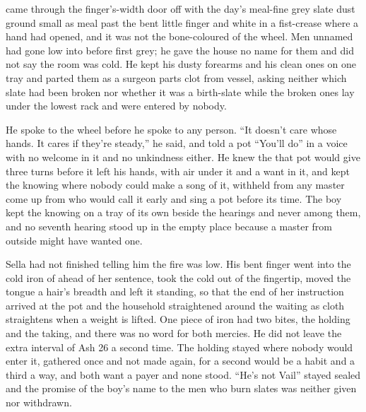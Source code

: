  came through the finger's-width door off  with the day's meal-fine grey slate dust ground small as meal past the bent little finger and white in a fist-crease where a hand had opened, and it was not the bone-coloured  of the wheel. Men unnamed had gone low into  before first grey; he gave the house no name for them and did not say the room was cold. He kept his dusty forearms and his clean ones on one tray and parted them as a surgeon parts clot from vessel, asking neither which slate had been broken nor whether it was a birth-slate while the broken ones lay under the lowest rack and were entered by nobody.

He spoke to the wheel before he spoke to any person. “It doesn't care whose hands. It cares if they're steady,” he said, and told a pot “You'll do” in a voice with no welcome in it and no unkindness either. He knew the  that pot would give three turns before it left his hands, with air under it and a want in it, and kept the knowing where nobody could make a song of it, withheld from any master come up from  who would call it early and sing a pot before its time. The boy kept the knowing on a tray of its own beside the hearings and never among them, and no seventh hearing stood up in the empty place because a master from outside might have wanted one.

Sella had not finished telling him the fire was low. His bent finger went into the cold iron of  ahead of her sentence, took the cold out of the fingertip, moved the tongue a hair's breadth and left it standing, so that the end of her instruction arrived at the pot and the household straightened around the waiting as cloth straightens when a weight is lifted. One piece of iron had two bites, the holding and the taking, and there was no  word for both mercies. He did not leave the extra interval of Ash 26 a second time. The holding stayed where nobody would enter it, gathered once and not made again, for a second would be a habit and a third a way, and both want a payer and none stood. “He's not Vail” stayed sealed and the promise of the boy's name to the men who burn slates was neither given nor withdrawn.

\scenebreak

